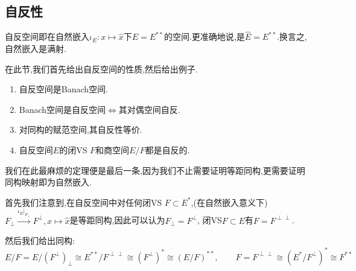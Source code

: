 \documentclass{article}
\begin{document}
\subsection{自反性}
自反空间即在自然嵌入$\iota_E:x\mapsto \widehat{x}$下$E=E^{**}$的空间.更准确地说,是$\widehat{E}=E^{**}$.换言之,自然嵌入是满射.

在此节,我们首先给出自反空间的性质,然后给出例子.

\begin{enumerate}[resume]
    \item 自反空间是Banach空间.
    \item Banach空间是自反空间$\iff$其对偶空间自反.\\
    \item 对同构的赋范空间,其自反性等价.
    \item 自反空间$E$的闭VS $F$和商空间$E/F$都是自反的.
\end{enumerate}

我们在此最麻烦的定理便是最后一条,因为我们不止需要证明等距同构,更需要证明同构映射即为自然嵌入.

首先我们注意到,在自反空间中对任何闭VS $F\subset E^*$,(在自然嵌入意义下)$F_\perp\stackrel{\iota_{E}|_{F_\perp}}{\to}F^\perp, x\mapsto \widehat{x}$是等距同构,因此可以认为$F_\perp=F^\perp$, 闭VS$F\subset E$有$F=F^{\perp\perp}$.

然后我们给出同构:$$E/F=E/(F^\perp)_{\perp}\cong E^{**}/F^{\perp\perp}\cong(F^\perp)^*\cong(E/F)^{**},\qquad F=F^{\perp\perp}\cong(E^*/F^\perp)^*\cong F^{**}$$
\end{document}
